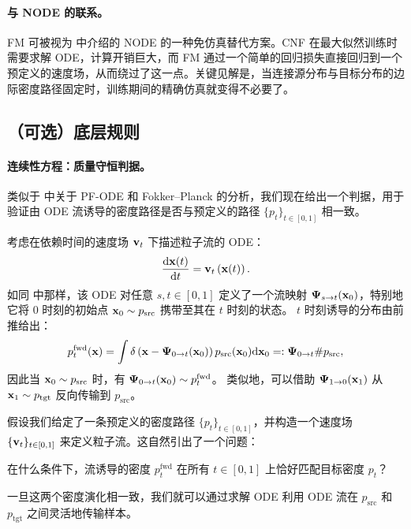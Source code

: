 \paragraph{与 NODE 的联系。}
FM 可被视为  中介绍的 NODE 的一种免仿真替代方案。CNF 在最大似然训练时需要求解 ODE，计算开销巨大，而 FM 通过一个简单的回归损失直接回归到一个预定义的速度场，从而绕过了这一点。关键见解是，当连接源分布与目标分布的边际密度路径固定时，训练期间的精确仿真就变得不必要了。


\subsection{（可选）底层规则}\label{subsec:fm-theory}

\paragraph{连续性方程：质量守恒判据。}
类似于  中关于 PF-ODE 和 Fokker–Planck 的分析，我们现在给出一个判据，用于验证由 ODE 流诱导的密度路径是否与预定义的路径 $\{p_t\}_{t \in [0,1]}$ 相一致。

考虑在依赖时间的速度场 ${\mathbf{v}}_t$ 下描述粒子流的 ODE：
\[
\frac{\mathop{}\!\mathrm{d} {\mathbf{x}}(t)}{\mathop{}\!\mathrm{d} t} = {\mathbf{v}}_t\left({\mathbf{x}}(t)\right).
\]
如同  中那样，该 ODE 对任意 $s,t \in [0,1]$ 定义了一个流映射
$\bm{\Psi}_{s\to t}({\mathbf{x}}_0)$，特别地它将 $0$ 时刻的初始点
${\mathbf{x}}_0 \sim p_{\mathrm{src}}$ 携带至其在 $t$ 时刻的状态。
$t$ 时刻诱导的分布由前推给出：
\begin{align}\label{eq:ode-pushforward}
    p_t^{\mathrm{fwd}}({\mathbf{x}})
    = \int \delta \left({\mathbf{x}} - \bm{\Psi}_{0\to t}({\mathbf{x}}_0)\right)
      p_{\mathrm{src}}({\mathbf{x}}_0) \mathrm{d}{\mathbf{x}}_0=: \bm{\Psi}_{0\to t}\# p_{\mathrm{src}},
\end{align}
因此当 ${\mathbf{x}}_0 \sim p_{\mathrm{src}}$ 时，有 $\bm{\Psi}_{0\to t}({\mathbf{x}}_0) \sim p_t^{\mathrm{fwd}}$。
类似地，可以借助 $\bm{\Psi}_{1\to 0}({\mathbf{x}}_1)$ 从 ${\mathbf{x}}_1 \sim p_{\mathrm{tgt}}$
反向传输到 $p_{\mathrm{src}}$。




假设我们给定了一条预定义的密度路径 $\{p_t\}_{t \in [0,1]}$，并构造一个速度场 $\{{\mathbf{v}}_t\}_{t \in [0,1]}$ 来定义粒子流。这自然引出了一个问题：

\begin{question}
    在什么条件下，流诱导的密度 $p_t^{\mathrm{fwd}}$ 在所有 $t \in [0,1]$ 上恰好匹配目标密度 $p_t$？
\end{question}
一旦这两个密度演化相一致，我们就可以通过求解 ODE 利用 ODE 流在 $p_{\mathrm{src}}$ 和 $p_{\mathrm{tgt}}$ 之间灵活地传输样本。

